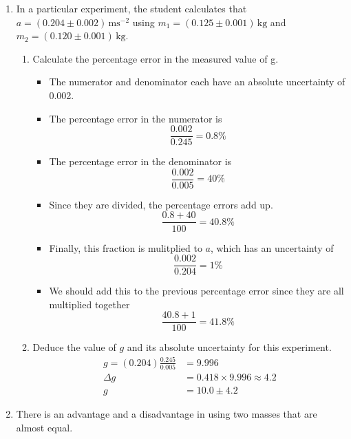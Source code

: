 \documentclass[a4paper,12pt]{article}
\begin{document}
\begin{enumerate}[label=(\alph*)]
  \item In a particular experiment, the student calculates that \( a = (0.204 \pm 0.002) \, \mathrm{ms^{-2}} \) using \( m_1 = (0.125 \pm 0.001) \, \mathrm{kg} \) and \( m_2 = (0.120 \pm 0.001) \, \mathrm{kg} \).

        \begin{enumerate}[label=(\roman*)]
          \item Calculate the percentage error in the measured value of g.
                \begin{itemize}
                  \item The numerator and denominator each have an absolute uncertainty of 0.002.
                  \item The percentage error in the numerator is
                        $$\frac{0.002}{0.245} = 0.8\%$$
                  \item The percentage error in the denominator is
                        $$\frac{0.002}{0.005} = 40\%$$
                  \item Since they are divided, the percentage errors add up.
                        $$\frac{0.8 + 40}{100} = 40.8\%$$
                  \item Finally, this fraction is mulitplied to $a$, which has an uncertainty of $$\frac{0.002}{0.204} = 1\%$$
                  \item We should add this to the previous percentage error since they are all multiplied together
                        $$\frac{40.8 + 1}{100} = 41.8\%$$
                \end{itemize}
          \item Deduce the value of $g$ and its absolute uncertainty for this experiment.
                \begin{align*}
                  g = (0.204)\frac{0.245}{0.005} & = 9.996                          \\
                  \Delta g                       & = 0.418 \times 9.996 \approx 4.2 \\
                  g                              & = 10.0 \pm 4.2
                \end{align*}

        \end{enumerate}
  \item There is an advantage and a disadvantage in using two masses that are almost equal.


\end{enumerate}
\end{document}
